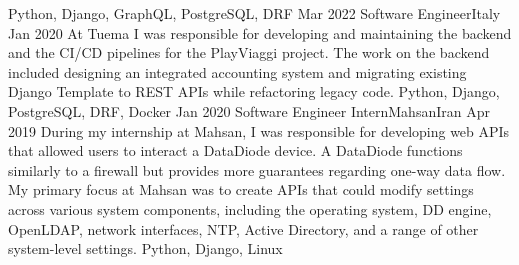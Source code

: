 \begin{experiences}
{  }
  {Python, Django, GraphQL, PostgreSQL, DRF}
  \emptySeparator
  \experience
  {Mar 2022} {Software Engineer}{}{Italy}
  {Jan 2020} {
    At Tuema I was responsible for developing and maintaining the backend and the CI/CD pipelines for the PlayViaggi project. The work on the backend included designing an integrated accounting system and migrating existing Django Template to REST APIs while refactoring legacy code.
  }
  {Python, Django, PostgreSQL, DRF, Docker}
  \emptySeparator
  \experience
  {Jan 2020} {Software Engineer Intern}{Mahsan}{Iran}
  {Apr 2019} {
    During my internship at Mahsan, I was responsible for developing web APIs that allowed users to interact a DataDiode device. A DataDiode functions similarly to a firewall but provides more guarantees regarding one-way data flow. My primary focus at Mahsan was to create APIs that could modify settings across various system components, including the operating system, DD engine, OpenLDAP, network interfaces, NTP, Active Directory, and a range of other system-level settings.
  }
  {Python, Django, Linux}
  \emptySeparator
\end{experiences}
